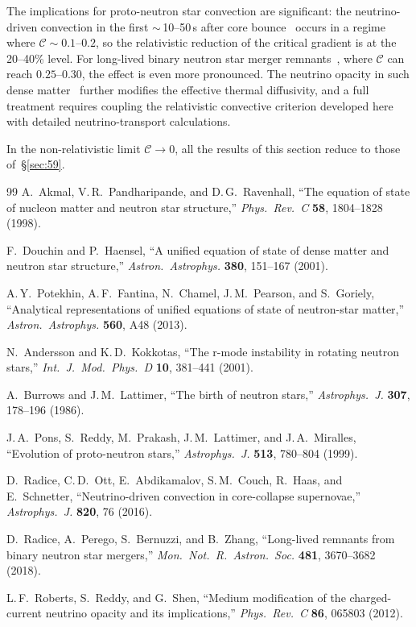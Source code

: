 The implications for proto-neutron star convection are significant:
the neutrino-driven convection in the first $\sim$\,10--50\,s
after core bounce~\cite{BurrowsLattimer1986,PonsEtAl1999,Radice2016}
occurs in a regime where $\mathscr{C} \sim 0.1$--$0.2$, so the
relativistic reduction of the critical gradient is at the 20--40\%
level.  For long-lived binary neutron star merger
remnants~\cite{Radice2018}, where
$\mathscr{C}$ can reach $0.25$--$0.30$, the effect is even more
pronounced.  The neutrino opacity in such dense
matter~\cite{RobertsReddyShen2012} further modifies the effective
thermal diffusivity, and a full treatment requires coupling the
relativistic convective criterion developed here with detailed
neutrino-transport calculations.

\bigskip
In the non-relativistic limit $\mathscr{C}\to 0$,
all the results of this section reduce to those of~\S\ref{sec:59}.

\begin{thebibliography}{99}
A.~Akmal, V.\,R.~Pandharipande, and D.\,G.~Ravenhall,
``The equation of state of nucleon matter and neutron star
structure,''
\emph{Phys.\ Rev.\ C} \textbf{58}, 1804--1828 (1998).

F.~Douchin and P.~Haensel,
``A unified equation of state of dense matter and neutron star
structure,''
\emph{Astron.\ Astrophys.} \textbf{380}, 151--167 (2001).

A.\,Y.~Potekhin, A.\,F.~Fantina, N.~Chamel, J.\,M.~Pearson,
and S.~Goriely,
``Analytical representations of unified equations of state of
neutron-star matter,''
\emph{Astron.\ Astrophys.} \textbf{560}, A48 (2013).

N.~Andersson and K.\,D.~Kokkotas,
``The r-mode instability in rotating neutron stars,''
\emph{Int.\ J.\ Mod.\ Phys.\ D} \textbf{10}, 381--441 (2001).

A.~Burrows and J.\,M.~Lattimer,
``The birth of neutron stars,''
\emph{Astrophys.\ J.} \textbf{307}, 178--196 (1986).

J.\,A.~Pons, S.~Reddy, M.~Prakash, J.\,M.~Lattimer, and
J.\,A.~Miralles,
``Evolution of proto-neutron stars,''
\emph{Astrophys.\ J.} \textbf{513}, 780--804 (1999).

D.~Radice, C.\,D.~Ott, E.~Abdikamalov, S.\,M.~Couch, R.~Haas,
and E.~Schnetter,
``Neutrino-driven convection in core-collapse supernovae,''
\emph{Astrophys.\ J.} \textbf{820}, 76 (2016).

D.~Radice, A.~Perego, S.~Bernuzzi, and B.~Zhang,
``Long-lived remnants from binary neutron star mergers,''
\emph{Mon.\ Not.\ R.\ Astron.\ Soc.} \textbf{481}, 3670--3682 (2018).

L.\,F.~Roberts, S.~Reddy, and G.~Shen,
``Medium modification of the charged-current neutrino opacity
and its implications,''
\emph{Phys.\ Rev.\ C} \textbf{86}, 065803 (2012).
\end{thebibliography}
